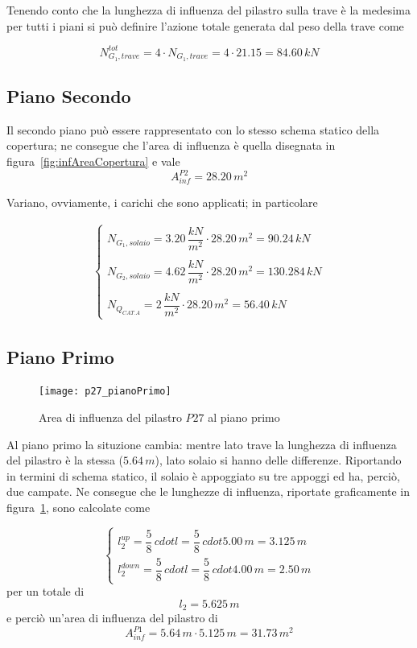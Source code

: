 Tenendo conto che la lunghezza di influenza del pilastro sulla trave è la medesima per tutti i piani si può definire l'azione totale generata dal peso della trave come

\[
	N_{G_1,trave}^{tot} = 4\cdot N_{G_1, trave} = 4 \cdot 21.15 = 84.60\,kN
\]

\subsection{Piano Secondo}
Il secondo piano può essere rappresentato con lo stesso schema statico della copertura; ne consegue che l'area di influenza è quella disegnata in figura~\ref{fig:infAreaCopertura} e vale
\[
	A_{inf}^{P2} = 28.20\,m^2
\]

Variano, ovviamente, i carichi che sono applicati; in particolare

\begin{align*}
	\begin{cases}
		N_{G_1, solaio} = 3.20\,\dfrac{kN}{m^2}\cdot28.20\,m^2 = 90.24\,kN\\\\
		N_{G_2, solaio} = 4.62\,\dfrac{kN}{m^2}\cdot28.20\,m^2 = 130.284\,kN\\\\
		N_{Q_{CAT.A}} = 2\,\dfrac{kN}{m^2}\cdot 28.20\,m^2 = 56.40\,kN
	\end{cases}
\end{align*}

\subsection{Piano Primo}

\begin{figure}
	\centering
	\texttt{[image: p27\_pianoPrimo]}
	\caption{Area di influenza del pilastro $P27$ al piano primo}
	\label{fig:infAreaPianoPrimo}
\end{figure}

Al piano primo la situzione cambia: mentre lato trave la lunghezza di influenza del pilastro è la stessa ($5.64\,m$), lato solaio si hanno delle differenze. Riportando in termini di schema statico, il solaio è appoggiato su tre appoggi ed ha, perciò, due campate. Ne consegue che le lunghezze di influenza, riportate graficamente in figura~\ref{fig:infAreaPianoPrimo}, sono calcolate come

\[
	\begin{cases}
		l_2^{up} = \dfrac{5}{8}\,cdot l = \dfrac{5}{8}\,cdot 5.00\,m = 3.125\,m\\
		l_2^{down} = \dfrac{5}{8}\,cdot l = \dfrac{5}{8}\,cdot 4.00\,m = 2.50\,m
	\end{cases}
\]
per un totale di
\[
	l_2 = 5.625\,m
\]
e perciò un'area di influenza del pilastro di
\[
	A_{inf}^{P1} = 5.64\,m \cdot 5.125\,m = 31.73\,m^2
\]

